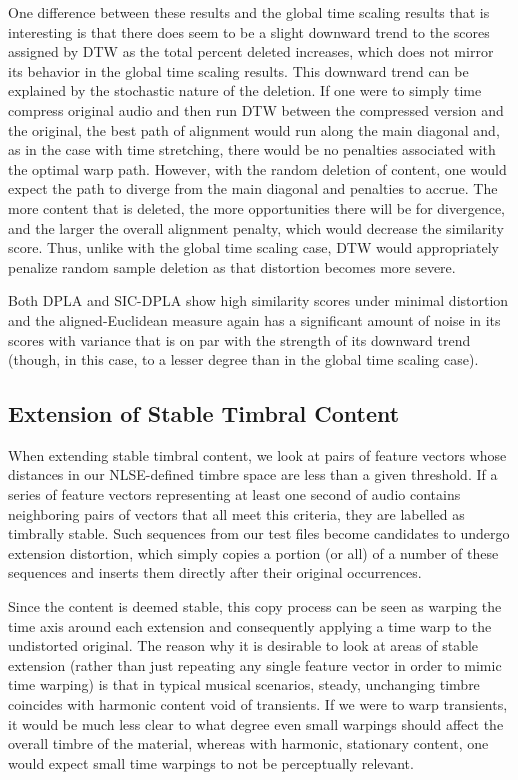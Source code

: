 \documentclass[12pt]{report} 	%
\numberwithin{figure}{chapter}
\numberwithin{table}{chapter}
\numberwithin{equation}{chapter}
\begin{document}
\begin{flushleft}
One difference between these results and the global time scaling results that is interesting is that there does seem to be a slight downward trend to the scores assigned by DTW as the total percent deleted increases, which does not mirror its behavior in the global time scaling results. This downward trend can be explained by the stochastic nature of the deletion. If one were to simply time compress original audio and then run DTW between the compressed version and the original, the best path of alignment would run along the main diagonal and, as in the case with time stretching, there would be no penalties associated with the optimal warp path. However, with the random deletion of content, one would expect the path to diverge from the main diagonal and penalties to accrue. The more content that is deleted, the more opportunities there will be for divergence, and the larger the overall alignment penalty, which would decrease the similarity score. Thus, unlike with the global time scaling case, DTW would appropriately penalize random sample deletion as that distortion becomes more severe.

Both DPLA and SIC-DPLA show high similarity scores under minimal distortion and the aligned-Euclidean measure again has a significant amount of noise in its scores with variance that is on par with the strength of its downward trend (though, in this case, to a lesser degree than in the global time scaling case).

\subsection{Extension of Stable Timbral Content}
When extending stable timbral content, we look at pairs of feature vectors whose distances in our NLSE-defined timbre space are less than a given threshold. If a series of feature vectors representing at least one second of audio contains neighboring pairs of vectors that all meet this criteria, they are labelled as timbrally stable. Such sequences from our test files become candidates to undergo extension distortion, which simply copies a portion (or all) of a number of these sequences and inserts them directly after their original occurrences.

Since the content is deemed stable, this copy process can be seen as warping the time axis around each extension and consequently applying a time warp to the undistorted original. The reason why it is desirable to look at areas of stable extension (rather than just repeating any single feature vector in order to mimic time warping) is that in typical musical scenarios, steady, unchanging timbre coincides with harmonic content void of transients. If we were to warp transients, it would be much less clear to what degree even small warpings should affect the overall timbre of the material, whereas with harmonic, stationary content, one would expect small time warpings to not be perceptually relevant.


\end{flushleft}
\end{document}
